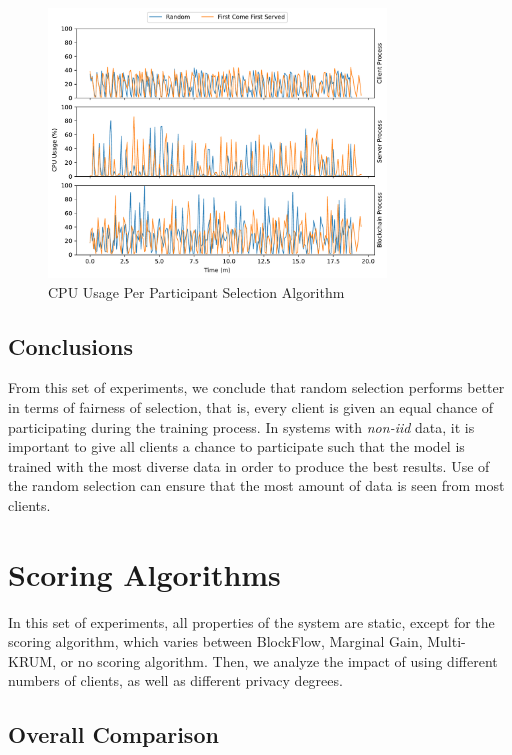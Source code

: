 \begin{figure}[!h]
    \centering
    \centering
    \includegraphics[width=0.8\textwidth]{graphics/selection/cpu.pdf}
    \caption{CPU Usage Per Participant Selection Algorithm}
    \label{fig:cpu_selection}
\end{figure}

\subsection{Conclusions}

From this set of experiments, we conclude that random selection performs better in terms of fairness of selection, that is, every client is given an equal chance of participating during the training process. In systems with \textit{non-iid} data, it is important to give all clients a chance to participate such that the model is trained with the most diverse data in order to produce the best results. Use of the random selection can ensure that the most amount of data is seen from most clients.

\section{Scoring Algorithms}

In this set of experiments, all properties of the system are static, except for the scoring algorithm, which varies between BlockFlow, Marginal Gain, Multi-KRUM, or no scoring algorithm. Then, we analyze the impact of using different numbers of clients, as well as different privacy degrees.

\subsection{Overall Comparison}\label{horizontal:scoring_overall}


